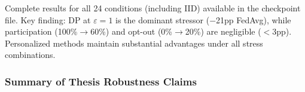 \documentclass[conference]{IEEEtran}
\begin{document}
\begin{table}[htbp]
\centering
\caption{Compound EHDS Stress Frontier (Cardiovascular, non-IID $\alpha{=}0.5$): Accuracy (\%) under combined stressors. Mean $\pm$ std over 3 seeds. Bold = best per condition. $\Delta_D$ = Ditto $-$ FedAvg gap.}
\label{tab:compound_stress_frontier}
\par{\footnotesize Complete results for all 24 conditions (including IID) available in the checkpoint file. Key finding: DP at $\varepsilon{=}1$ is the dominant stressor ($-$21pp FedAvg), while participation (100\%$\to$60\%) and opt-out (0\%$\to$20\%) are negligible ($<$3pp). Personalized methods maintain substantial advantages under all stress combinations.}
\end{table}

\subsubsection{Summary of Thesis Robustness Claims}
\label{sec:thesis_summary}
\end{document}

